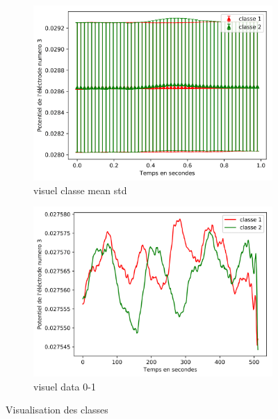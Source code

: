 \documentclass{article}[12pt]
\begin{document}
\begin{figure}[]
        \centering
        \begin{subfigure}[b]{0.475\textwidth}
            \centering
            \includegraphics[width=\textwidth]{images/visuel_classe_mean_std-1.png}
            \caption[Network2]%
            {{\small visuel classe mean std}}    
            \label{fig:mean and std of net14}
        \end{subfigure}
        \hfill
        \begin{subfigure}[b]{0.475\textwidth}  
            \centering 
            \includegraphics[width=\textwidth]{images/visuel_data_0-1.png}
            \caption[]%
            {{\small visuel data 0-1 }}    
            \label{fig:mean and std of net24}
        \end{subfigure}
        \caption[ Visualisation des classes]
        {\small Visualisation des classes} 
        \label{fig:mean and std of nets}
    \end{figure}
    
\end{document}

